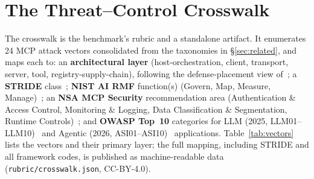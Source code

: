 \documentclass[11pt]{article}
\newcommand{\code}[1]{\texttt{\small #1}}
\begin{document}
\section{The Threat--Control Crosswalk}
\label{sec:crosswalk}

The crosswalk is the benchmark's rubric and a standalone artifact. It enumerates 24 MCP attack vectors consolidated from the taxonomies in \S\ref{sec:related}, and maps each to: an \textbf{architectural layer} (host-orchestration, client, transport, server, tool, registry-supply-chain), following the defense-placement view of~\citet{mcpdpt2604}; a \textbf{STRIDE} class~\citep{stridemodel}; \textbf{NIST AI RMF} function(s) (Govern, Map, Measure, Manage)~\citep{nistairmf}; an \textbf{NSA MCP Security} recommendation area (Authentication \& Access Control, Monitoring \& Logging, Data Classification \& Segmentation, Runtime Controls)~\citep{nsamcp2026}; and \textbf{OWASP Top~10} categories for LLM (2025, LLM01--LLM10)~\citep{owaspllm2025} and Agentic (2026, ASI01--ASI10)~\citep{owaspasi2026} applications. Table~\ref{tab:vectors} lists the vectors and their primary layer; the full mapping, including STRIDE and all framework codes, is published as machine-readable data (\code{rubric/crosswalk.json}, CC-BY-4.0).
\end{document}
